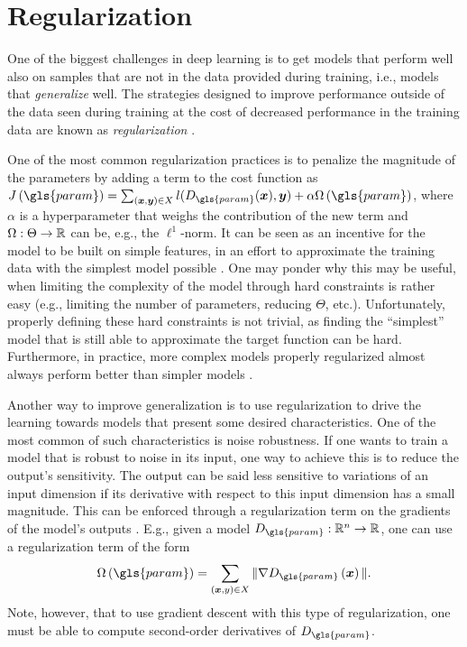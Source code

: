 \section{Regularization}\label{sec:regularization}

One of the biggest challenges in deep learning is to get models that perform well also on samples that are not in the data provided during training, i.e., models that \emph{generalize} well.
The strategies designed to improve performance outside of the data seen during training at the cost of decreased performance in the training data are known as \emph{regularization} \cite{goodfellow_deep_2016}.

One of the most common regularization practices is to penalize the magnitude of the parameters by adding a term to the cost function as $J\left( \gls{param} \right) = \sum_{(\bm{x},\bm{y})\in X} l(D_{\gls{param}}(\bm{x}), \bm{y}) + \alpha\Omega\left( \gls{param} \right) $, where $\alpha$ is a hyperparameter that weighs the contribution of the new term and $\Omega:\Theta\to\mathbb{R}$ can be, e.g., the $\ell^1$-norm.
It can be seen as an incentive for the model to be built on simple features, in an effort to approximate the training data with the simplest model possible \cite{goodfellow_deep_2016}.
One may ponder why this may be useful, when limiting the complexity of the model through hard constraints is rather easy (e.g., limiting the number of parameters, reducing $\Theta$, etc.).
Unfortunately, properly defining these hard constraints is not trivial, as finding the ``simplest'' model that is still able to approximate the target function can be hard.
Furthermore, in practice, more complex models properly regularized almost always perform better than simpler models \cite{goodfellow_deep_2016}.

Another way to improve generalization is to use regularization to drive the learning towards models that present some desired characteristics.
One of the most common of such characteristics is noise robustness.
If one wants to train a model that is robust to noise in its input, one way to achieve this is to reduce the output's sensitivity.
The output can be said less sensitive to variations of an input dimension if its derivative with respect to this input dimension has a small magnitude.
This can be enforced through a regularization term on the gradients of the model's outputs \cite{drucker_improving_1992}.
E.g., given a model $D_{\gls{param}}:\R^n\to\R$, one can use a regularization term of the form \[
    \Omega\left( \gls{param} \right) = \sum_{\left( \bm{x},y \right) \in X} \| \nabla D_{\gls{param}}\left( \bm{x} \right) \|
.\] Note, however, that to use gradient descent with this type of regularization, one must be able to compute second-order derivatives of $D_{\gls{param}}$.

